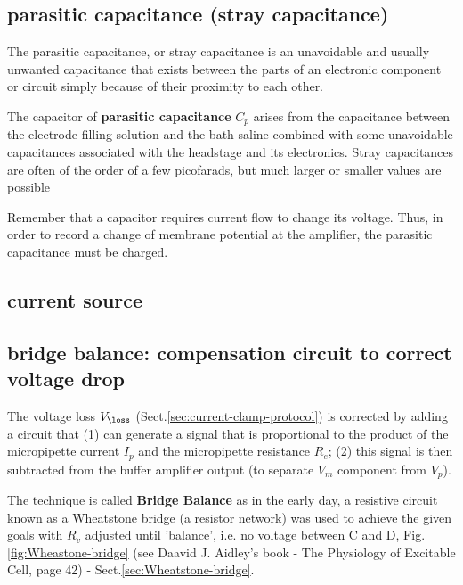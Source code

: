 \clearpage 

\subsection{parasitic capacitance (stray capacitance)}
\label{sec:current-clamp-stray-capacitance}
\label{sec:parasitic-capacitance}

The parasitic capacitance, or stray capacitance is an unavoidable and usually
unwanted capacitance that exists between the parts of an electronic component or
circuit simply because of their proximity to each other.



The capacitor of {\bf parasitic capacitance} $C_p$ arises from the capacitance
between the electrode  filling solution and the bath saline combined with some
unavoidable capacitances associated with the headstage and its electronics.
Stray capacitances are often of the order of a few picofarads, but much larger
or smaller values are possible

 Remember that a capacitor requires current flow to change its voltage.
Thus, in order to record a change of membrane potential at the amplifier,
the parasitic capacitance must be charged.


\subsection{current source}
\label{sec:current-clamp-current-source}



\subsection{bridge balance: compensation circuit to correct
voltage drop}
\label{sec:bridge-balance}
\label{sec:current-clamp-bridge-balance}


The voltage loss $V_\loss$ (Sect.\ref{sec:current-clamp-protocol}) is corrected
by adding a circuit that (1) can generate a signal that is proportional to the
product of the micropipette current $I_p$ and the micropipette resistance $R_e$;
(2) this signal is then subtracted from the buffer amplifier output (to separate $V_m$
component from $V_p$). 

The technique is called {\bf Bridge Balance} as in the
early day, a resistive circuit known as a Wheatstone bridge (a resistor network)
was used to achieve the given goals with $R_v$ adjusted until 'balance', i.e. no
voltage between C and D, Fig.\ref{fig:Wheastone-bridge} (see Daavid J.
Aidley's book - The Physiology of Excitable Cell, page 42) -
Sect.\ref{sec:Wheatstone-bridge}.

